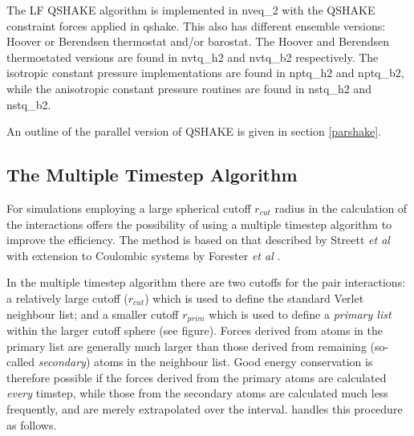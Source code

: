 The LF QSHAKE algorithm is implemented in {\sc nveq\_2} with the
QSHAKE constraint forces applied in {\sc
qshake}.  This also has different ensemble versions:
Hoover or Berendsen
thermostat and/or
barostat.  The Hoover and Berendsen
thermostated versions are found in {\sc nvtq\_h2} and {\sc nvtq\_b2}
respectively. The isotropic constant pressure implementations are
found in {\sc nptq\_h2} and {\sc nptq\_b2}, while the anisotropic
constant pressure routines are found in {\sc nstq\_h2} and {\sc
nstq\_b2}. 

An outline of the parallel version of QSHAKE
is given in section \ref{parshake}.
 
\subsection{The \D{} Multiple Timestep Algorithm}
\label{multistep}

For simulations employing a large spherical cutoff $r_{cut}$ radius in the
calculation of the interactions \D{} offers the possibility of using a
multiple timestep algorithm to improve the efficiency. The method is
based on that described by Streett {\em et al}
\cite{streett-78a,streett-78b} with extension to
Coulombic systems by Forester {\em et al} \cite{forester-94c}.

In the multiple timestep algorithm there are two cutoffs for the pair
interactions: a relatively large cutoff ($r_{cut}$) which is used to
define the standard Verlet neighbour list; and a smaller cutoff
$r_{prim}$ which is used to define a {\em primary list} within the
larger cutoff sphere (see figure). Forces derived from atoms in the
primary list are generally much larger than those derived from
remaining (so-called {\em secondary}) atoms in the neighbour list.
Good energy conservation is therefore possible if the forces derived
from the primary atoms are calculated {\em every} timstep, while those
from the secondary atoms are calculated much less frequently, and are
merely extrapolated over the interval. \D{} handles this procedure as
follows.

